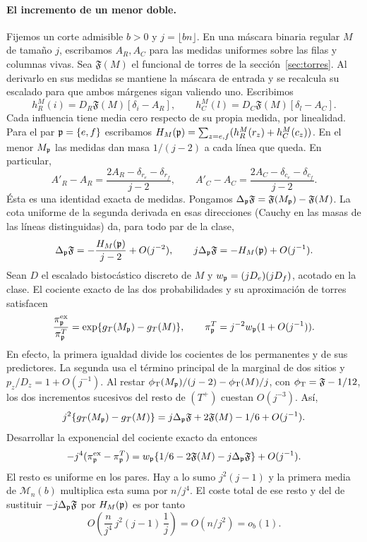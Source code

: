 \paragraph{El incremento de un menor doble.}
Fijemos un corte admisible \(b>0\) y \(j=\lfloor bn\rfloor\). En una máscara binaria regular
\(M\) de tamaño \(j\), escribamos \(A_R,A_C\) para las medidas uniformes sobre las filas y
columnas vivas. Sea \(\mathfrak F(M)\) el funcional de torres de la sección~\ref{sec:torres}.
Al derivarlo en sus medidas se mantiene la máscara de entrada y se recalcula su escalado
para que ambos márgenes sigan valiendo uno. Escribimos
\[
 h_R^M(i)=D_R\mathfrak F(M)[\delta_i-A_R],\qquad
 h_C^M(l)=D_C\mathfrak F(M)[\delta_l-A_C].
\]
Cada influencia tiene media cero respecto de su propia medida, por linealidad. Para el par
\(\mathfrak p=\{e,f\}\) escribamos \(H_M(\mathfrak p)=\sum_{z=e,f}(h_R^M(r_z)+h_C^M(c_z))\).
En el menor \(M_{\mathfrak p}\) las medidas dan masa \(1/(j-2)\) a cada línea que queda. En particular,
\[
 A'_R-A_R=\frac{2A_R-\delta_{r_e}-\delta_{r_f}}{j-2},\qquad
 A'_C-A_C=\frac{2A_C-\delta_{c_e}-\delta_{c_f}}{j-2}.
\]
Ésta es una identidad exacta de medidas. Pongamos
\(\Delta_{\mathfrak p}\mathfrak F=\mathfrak F(M_{\mathfrak p})-\mathfrak F(M)\).
La cota uniforme de la segunda derivada en esas direcciones (Cauchy en las masas de las
líneas distinguidas) da, para todo par de la clase,
\[
 \Delta_{\mathfrak p}\mathfrak F=-\frac{H_M(\mathfrak p)}{j-2}+O(j^{-2}),\qquad
 j\Delta_{\mathfrak p}\mathfrak F=-H_M(\mathfrak p)+O(j^{-1}).
\]
Sean \(D\) el escalado bistocástico discreto de \(M\) y \(w_{\mathfrak p}=(jD_e)(jD_f)\), acotado en la
clase. El cociente exacto de las dos probabilidades y su aproximación de torres satisfacen
\[
 \frac{\pi_{\mathfrak p}^{\rm ex}}{\pi_{\mathfrak p}^T}=\exp\{g_T(M_{\mathfrak p})-g_T(M)\},\qquad
 \pi_{\mathfrak p}^T=j^{-2}w_{\mathfrak p}(1+O(j^{-1})).
\]
En efecto, la primera igualdad divide los cocientes de los permanentes y de sus predictores.
La segunda usa el término principal de la marginal de dos sitios y \(p_z/D_z=1+O(j^{-1})\).
Al restar \(\phi_{\mathrm T}(M_{\mathfrak p})/(j-2)-\phi_{\mathrm T}(M)/j\), con \(\phi_{\mathrm T}=\mathfrak F-1/12\), los dos
incrementos sucesivos del resto de \((T^+)\) cuestan \(O(j^{-3})\). Así,
\[
 j^2\{g_T(M_{\mathfrak p})-g_T(M)\}
 =j\Delta_{\mathfrak p}\mathfrak F+2\mathfrak F(M)-1/6+O(j^{-1}).
\]
Desarrollar la exponencial del cociente exacto da entonces
\begin{equation}\label{eq:pt-par-fisico}
 -j^4(\pi_{\mathfrak p}^{\rm ex}-\pi_{\mathfrak p}^T)
 =w_{\mathfrak p}\{1/6-2\mathfrak F(M)-j\Delta_{\mathfrak p}\mathfrak F\}+O(j^{-1}).
\end{equation}
El resto es uniforme en los pares. Hay a lo sumo \(j^2(j-1)\) y la primera media de
\(\mathcal M_n(b)\) multiplica esta suma por \(n/j^4\). El coste total de ese resto y del
de sustituir \(-j\Delta_{\mathfrak p}\mathfrak F\) por \(H_M(\mathfrak p)\) es por tanto
\[
 O\!\left(\frac{n}{j^4}\,j^2(j-1)\,\frac1j\right)
 =O(n/j^2)=o_b(1).
\]

